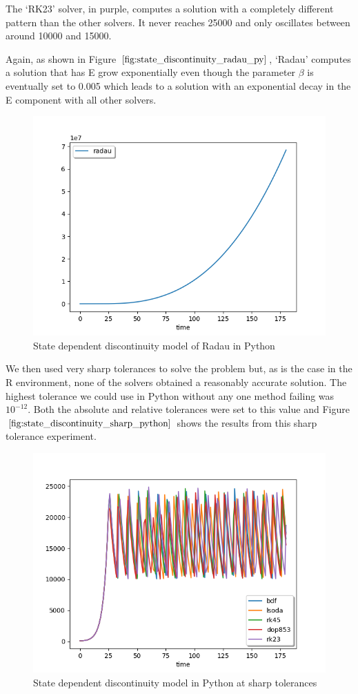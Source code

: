 The `RK23' solver, in purple, computes a solution with a completely different pattern than the other solvers. It never reaches 25000 and only oscillates between around 10000 and 15000. 

Again, as shown in Figure $\ref{fig:state_discontinuity_radau_py}$, `Radau' computes a solution that has E grow exponentially even though the parameter $\beta$ is eventually set to 0.005 which leads to a solution with an exponential decay in the E component with all other solvers.

\begin{figure}[h]
\centering
\includegraphics[width=0.7\linewidth]{./figures/state_discontinuity_radau_py}
\caption{State dependent discontinuity model of Radau in Python}
\label{fig:state_discontinuity_radau_py}
\end{figure}

We then used very sharp tolerances to solve the problem but, as is the case in the R environment, none of the solvers obtained a reasonably accurate solution. The highest tolerance we could use in Python without any one method failing was $10^{-12}$. Both the absolute and relative tolerances were set to this value and Figure $\ref{fig:state_discontinuity_sharp_python}$ shows the results from this sharp tolerance experiment.

\begin{figure}[H]
\centering
\includegraphics[width=0.7\linewidth]{./figures/state_discontinuity_sharp_py}
\caption{State dependent discontinuity model in Python at sharp tolerances}
\label{fig:state_discontinuity_sharp_python}
\end{figure}


